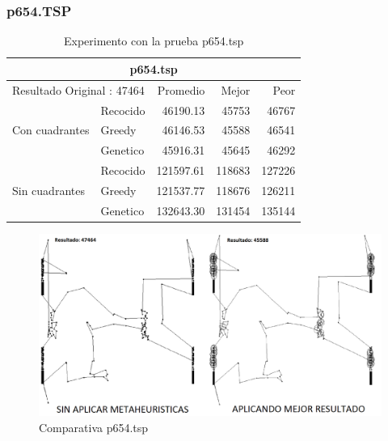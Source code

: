 \subsubsection{p654.TSP}
\begin{table}[hbtp]
 \centering 
	\begin{tabular}{ | l   l | r | r | r |   }
        \hline\multicolumn{5}{|c|}{ \rowcolor[gray]{0.8}p654.tsp} \\\hline
         \multicolumn{2}{|l|}{Resultado Original : 47464} & Promedio & Mejor & Peor \\ \hline
                        & Recocido  & 46190.13 & 45753 & 46767  \\ 
         Con cuadrantes & Greedy    & 46146.53 & 45588 & 46541  \\ 
                        & Genetico  & 45916.31 & 45645 & 46292  \\ \hline
                        & Recocido  & 121597.61 & 118683 & 127226   \\ 
         Sin cuadrantes & Greedy    & 121537.77 & 118676 & 126211   \\ 
                        & Genetico  & 132643.30 & 131454 & 135144    \\ \hline
    \end{tabular}
    \caption{Experimento con la prueba p654.tsp}
    \label{table:EXP_p654.tsp}
\end{table}
\begin{figure}[hbtp]
    \centering
        \includegraphics[width=1\textwidth]{PruebasResultados/Experimentos_Comparativas/p654.png}
        \caption{Comparativa p654.tsp}
        \label{fig:p654_comparativa.png}
\end{figure}
